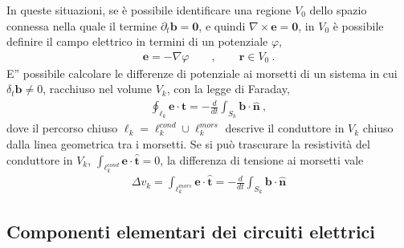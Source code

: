 \documentclass[letterpaper,10pt,italian]{jupyterBook}
\begin{document}
\sphinxAtStartPar
In queste situazioni, se è possibile identificare una regione \(V_0\) dello spazio connessa nella quale il termine \(\partial_t \mathbf{b} = \mathbf{0}\), e quindi \(\nabla \times \mathbf{e} = \mathbf{0}\), in \(V_0\) è possibile definire il campo elettrico in termini di un potenziale \(\varphi\),
\begin{equation*}
\begin{split}\mathbf{e} = - \nabla \varphi \qquad , \qquad \mathbf{r} \in V_0 \ .\end{split}
\end{equation*}
\sphinxAtStartPar
E” possibile calcolare le differenze di potenziale ai morsetti di un sistema in cui \(\delta_t \mathbf{b} \ne 0\), racchiuso nel volume \(V_k\), con la legge di Faraday,
\begin{equation*}
\begin{split}\oint_{\ell_k} \mathbf{e} \cdot \hat{\mathbf{t}} = - \frac{d}{dt} \int_{S_k} \mathbf{b} \cdot \hat{\mathbf{n}} \ ,\end{split}
\end{equation*}
\sphinxAtStartPar
dove il percorso chiuso \(\ell_k = \ell_k^{cond} \cup \ell_k^{mors}\) descrive il conduttore in \(V_k\) chiuso dalla linea geometrica tra i morsetti. Se si può trascurare la resistività del conduttore in \(V_k\), \(\int_{\ell_k^{cond}} \mathbf{e} \cdot \hat{\mathbf{t}} = 0\), la differenza di tensione ai morsetti vale
\begin{equation*}
\begin{split}\Delta v_k = \int_{\ell^{mors}_k} \mathbf{e} \cdot \hat{\mathbf{t}} = - \frac{d}{dt} \int_{S_k} \mathbf{b} \cdot \hat{\mathbf{n}}\end{split}
\end{equation*}
\sphinxstepscope




\subsection{Componenti elementari dei circuiti elettrici}
\label{\detokenize{ch/circuits-electric-components:componenti-elementari-dei-circuiti-elettrici}}\label{\detokenize{ch/circuits-electric-components:classical-electromagnetism-circuits-electric-components}}\label{\detokenize{ch/circuits-electric-components::doc}}
\end{document}
